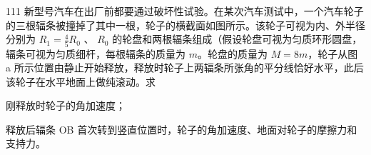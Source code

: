 \begin{problem}[第36届全国中学生物理竞赛决赛][汽车轮子破坏性试验]{111}
    新型号汽车在出厂前都要通过破坏性试验。在某次汽车测试中，一个汽车轮子的三根辐条被撞掉了其中一根，轮子的横截面如图所示。该轮子可视为内、外半径分别为
    $R_{1}=\frac{4}{5}R_{0}$ 、 $R_{0}$ 的轮盘和两根辐条组成（假设轮盘可视为匀质环形圆盘，辐条可视为匀质细杆，每根辐条的质量为 $m$。轮盘的质量为 $M=8m$，轮子从图 a 所示位置由静止开始释放，释放时轮子上两辐条所张角的平分线恰好水平，此后该轮子在水平地面上做纯滚动。求
    \begin{subproblem}
        刚释放时轮子的角加速度；
    \end{subproblem}
    \begin{subproblem}
        释放后辐条 OB 首次转到竖直位置时，轮子的角加速度、地面对轮子的摩擦力和支持力。
    \end{subproblem}
\end{problem}